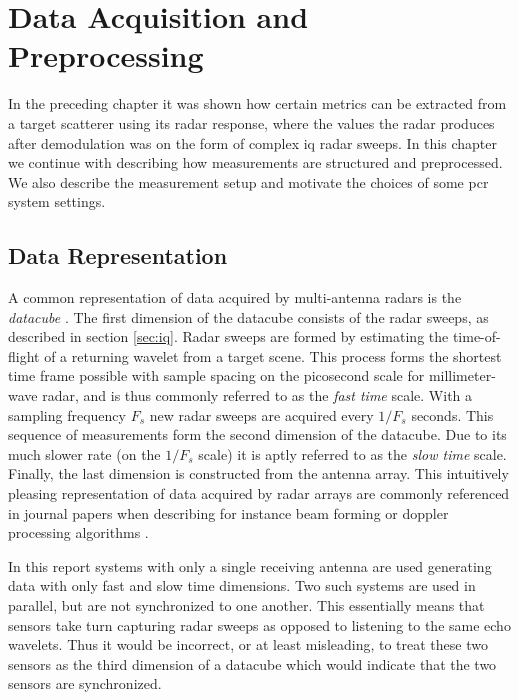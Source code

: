 \chapter{Data Acquisition and Preprocessing}

In the preceding chapter it was shown how certain metrics can be extracted from a target scatterer using its radar response, where the values the radar produces after demodulation was on the form of complex \gls{iq} radar sweeps. In this chapter we continue with describing how measurements are structured and preprocessed. We also describe the measurement setup and motivate the choices of some \gls{pcr} system settings.

\section{Data Representation}

A common representation of data acquired by multi-antenna radars is the \emph{datacube} \citep{richards_2014}. The first dimension of the datacube consists of the radar sweeps, as described in section \ref{sec:iq}. Radar sweeps are formed by estimating the time-of-flight of a returning wavelet from a target scene. This process forms the shortest time frame possible with sample spacing on the picosecond scale for millimeter-wave radar, and is thus commonly referred to as the \emph{fast time} scale. With a sampling frequency $F_s$ new radar sweeps are acquired every $1/F_s$ seconds. This sequence of measurements form the second dimension of the datacube. Due to its much slower rate (on the $1/F_s$ scale) it is aptly referred to as the \emph{slow time} scale. Finally, the last dimension is constructed from the antenna array. This intuitively pleasing representation of data acquired by radar arrays are commonly referenced in journal papers when describing for instance beam forming or doppler processing algorithms \citep{gentile_donovan_2018}. 

In this report systems with only a single receiving antenna are used generating data with only fast and slow time dimensions. Two such systems are used in parallel, but are not synchronized to one another. This essentially means that sensors take turn capturing radar sweeps as opposed to listening to the same echo wavelets. Thus it would be incorrect, or at least misleading, to treat these two sensors as the third dimension of a datacube which would indicate that the two sensors are synchronized. 

